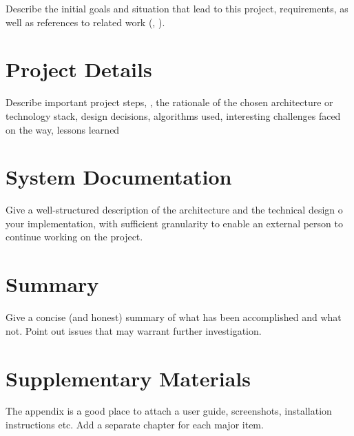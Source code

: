 \documentclass[notitlepage,english]{hgbreport}
\begin{document}
Describe the initial goals and situation that lead to this project, requirements, as well as
references to related work (\eg, \cite{Higham1998}).



\chapter{Project Details}

Describe important project steps, \eg, the rationale of the chosen architecture or technology stack, 
design decisions, algorithms used, interesting challenges faced on the way, lessons 
learned \etc


\chapter{System Documentation}

Give a well-structured description of the architecture and the technical design
o your implementation,
with sufficient granularity to enable an external person to
continue working on the project.


\chapter{Summary}

Give a concise (and honest) summary of what has been accomplished and what not. 
Point out issues that may warrant further investigation.


\appendix %


\chapter{Supplementary Materials}

The appendix is a good place to attach a user guide, screenshots, installation instructions etc.
Add a separate chapter for each major item.


\MakeBibliography[nosplit]
\end{document}
